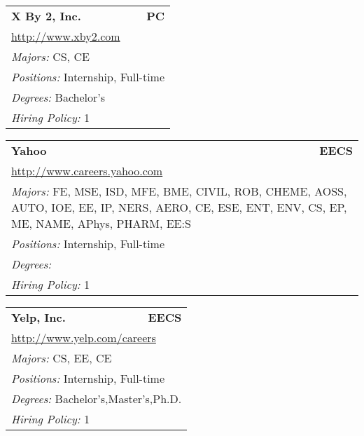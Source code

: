 \documentclass[twoside]{article}
\begin{document}
\begin{center}
\begin{multicols}{3}
\begin{FlushLeft}
\begin{minipage}{\columnwidth}
\end{minipage}
 
\begin{minipage}{\columnwidth}\begin{tabularx}{.95\columnwidth}{Xr}
                 {\Large\bf X By 2, Inc.} & {\Large\bf PC}\\
    \multicolumn{2}{p{.95\columnwidth}}{\url{http://www.xby2.com}}\\
    \multicolumn{2}{p{.95\columnwidth}}{\emph{Majors:} CS, CE}\\
    \multicolumn{2}{p{.95\columnwidth}}{\emph{Positions:} Internship, Full-time}\\
    \multicolumn{2}{p{.95\columnwidth}}{\emph{Degrees:} Bachelor's}\\
    \multicolumn{2}{p{.95\columnwidth}}{\emph{Hiring Policy:} 1}\\
    \end{tabularx}
    
\end{minipage}
 
\begin{minipage}{\columnwidth}\begin{tabularx}{.95\columnwidth}{Xr}
                 {\Large\bf Yahoo} & {\Large\bf EECS}\\
    \multicolumn{2}{p{.95\columnwidth}}{\url{http://www.careers.yahoo.com}}\\
    \multicolumn{2}{p{.95\columnwidth}}{\emph{Majors:} FE, MSE, ISD, MFE, BME, CIVIL, ROB, CHEME, AOSS, AUTO, IOE, EE, IP, NERS, AERO, CE, ESE, ENT, ENV, CS, EP, ME, NAME, APhys, PHARM, EE:S}\\
    \multicolumn{2}{p{.95\columnwidth}}{\emph{Positions:} Internship, Full-time}\\
    \multicolumn{2}{p{.95\columnwidth}}{\emph{Degrees:} }\\
    \multicolumn{2}{p{.95\columnwidth}}{\emph{Hiring Policy:} 1}\\
    \end{tabularx}
    
\end{minipage}
 
\begin{minipage}{\columnwidth}\begin{tabularx}{.95\columnwidth}{Xr}
                 {\Large\bf Yelp, Inc.} & {\Large\bf EECS}\\
    \multicolumn{2}{p{.95\columnwidth}}{\url{http://www.yelp.com/careers}}\\
    \multicolumn{2}{p{.95\columnwidth}}{\emph{Majors:} CS, EE, CE}\\
    \multicolumn{2}{p{.95\columnwidth}}{\emph{Positions:} Internship, Full-time}\\
    \multicolumn{2}{p{.95\columnwidth}}{\emph{Degrees:} Bachelor's,Master's,Ph.D.}\\
    \multicolumn{2}{p{.95\columnwidth}}{\emph{Hiring Policy:} 1}\\
    \end{tabularx}
    

\end{minipage}
\end{FlushLeft}
\end{multicols}
\end{center}
\end{document}
